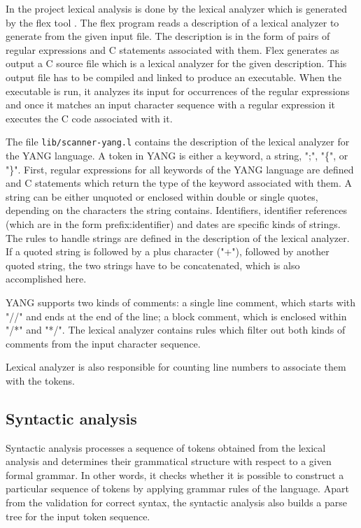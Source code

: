 \documentclass[conference]{IEEEtran}
\begin{document}
In the project lexical analysis is done by the lexical analyzer which is generated by the flex tool \cite{bib5}. The flex program reads a description of a lexical analyzer to generate from the given input file. The description is in the form of pairs of regular expressions and C statements associated with them. Flex generates as output a C source file which is a lexical analyzer for the given description. This output file has to be compiled and linked to produce an executable. When the executable is run, it analyzes its input for occurrences of the regular expressions and once it matches an input character sequence with a regular expression it executes the C code associated with it.

The file \texttt{lib/scanner-yang.l} contains the description of the lexical analyzer for the YANG language.
A token in YANG is either a keyword, a string, ";", "\{", or "\}". 
First, regular expressions for all keywords of the YANG language are defined and C statements which return the type of the keyword associated with them.
A string can be either unquoted  or enclosed within double or single quotes, depending on the characters the string contains. 
Identifiers, identifier references (which are in the form prefix:identifier) and dates  are specific kinds of strings.
The rules to handle strings are defined in the description of the lexical analyzer.
If a quoted string is followed by a plus character ("+"), followed by another quoted string, 
the two strings have to be concatenated, which is also accomplished here.

YANG supports two kinds of comments: a single line comment, which starts with "//" and  ends at the end of the line; 
a block comment, which is enclosed within "/*"  and "*/". 
The lexical analyzer contains rules which filter out both kinds of comments from the input character sequence.

Lexical analyzer is also responsible for counting line numbers to associate them with the tokens.

\subsection{Syntactic analysis}
Syntactic analysis processes a sequence of tokens obtained from the lexical analysis and determines their grammatical structure with respect to a given formal grammar. 
In other words, it checks whether it is possible to construct a particular sequence of tokens by applying grammar rules of the language.
Apart from the validation for correct syntax, the syntactic analysis also builds a parse tree for the input token sequence. 
\end{document}
